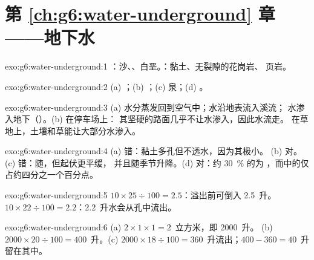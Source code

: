 \section*{第 \ref{ch:g6:water-underground} 章——地下水}

\begin{solution}{exo:g6:water-underground:1}
：沙、、白垩。：黏土、无裂隙的花岗岩、
页岩。
\end{solution}

\begin{solution}{exo:g6:water-underground:2}
(a) ；(b) ；(c) 泉；(d) 。
\end{solution}

\begin{solution}{exo:g6:water-underground:3}
(a) 水分蒸发回到空气中；水沿地表流入溪流；
水渗入地下（）。(b) 在停车场上：
其坚硬的路面几乎不让水渗入，因此水流走。
在草地上，土壤和草能让大部分水渗入。
\end{solution}

\begin{solution}{exo:g6:water-underground:4}
(a) 错：黏土多孔但不透水，因为其极小。
(b) 对。(c) 错：随，但起伏更平缓，
并且随季节升降。(d) 对：约 30~\% 的为
，而中的仅占约四分之一个百分点。
\end{solution}

\begin{solution}{exo:g6:water-underground:5}
$10 \times 25 \div 100 = 2.5$：溢出前可倒入 2.5~升。
$10 \times 22 \div 100 = 2.2$：2.2~升水会从孔中流出。
\end{solution}

\begin{solution}{exo:g6:water-underground:6}
(a) $2 \times 1 \times 1 = 2$~立方米，即 2000~升。
(b) $2000 \times 20 \div 100 = 400$~升。(c) $2000 \times 18 \div 100 =
360$~升流出；$400 - 360 = 40$~升留在其中。
\end{solution}

